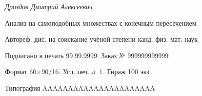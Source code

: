 \documentclass[a5paper,9pt,twoside]{extarticle} %
\begin{document}
\newpage\thispagestyle{empty}

\vspace*{0pt plus1fill}

\small
\begin{center}
\textit{Дроздов Дмитрий Алексеевич}
\par\medskip

Анализ на самоподобных множествах с конечным пересечением
\par\medskip

Автореф. дис. на соискание учёной степени канд. физ.-мат. наук
\par\bigskip

Подписано в печать 99.99.9999.
Заказ № 999999999999

Формат 60\(\times\)90/16. Усл. печ. л. 1. Тираж 100 экз.

Типография AAAAAAAAAAAAAAAAAAAAAA
\end{center}
\cleardoublepage
\end{document}
